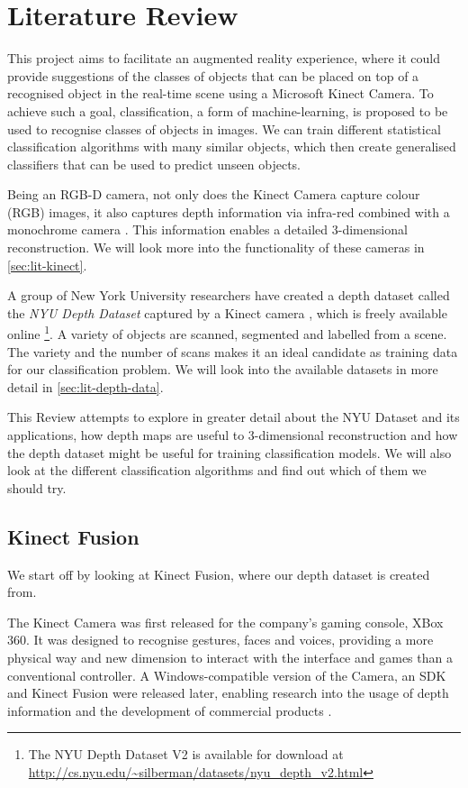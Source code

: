 \chapter{Literature Review} \label{chap:lit-review}
This project aims to facilitate an augmented reality experience, where it could provide suggestions of the classes of objects that can be placed on top of a recognised object in the real-time scene using a Microsoft Kinect Camera. To achieve such a goal, classification, a form of machine-learning, is proposed to be used to recognise classes of objects in images. We can train different statistical classification algorithms with many similar objects, which then create generalised classifiers that can be used to predict unseen objects. 

Being an RGB-D camera, not only does the Kinect Camera capture colour (RGB) images, it also captures depth information via infra-red combined with a monochrome camera \cite{kinect-doc}. This information enables a detailed 3-dimensional reconstruction. We will look more into the functionality of these cameras in \autoref{sec:lit-kinect}.

A group of New York University researchers have created a depth dataset called the \textit{NYU Depth Dataset} captured by a Kinect camera \cite{nyu-dataset}, which is freely available online \footnote{The NYU Depth Dataset V2 is available for download at \url{http://cs.nyu.edu/~silberman/datasets/nyu_depth_v2.html}}. A variety of objects are scanned, segmented and labelled from a scene. The variety and the number of scans makes it an ideal candidate as training data for our classification problem. We will look into the available datasets in more detail in \autoref{sec:lit-depth-data}.

This Review attempts to explore in greater detail about the NYU Dataset and its applications, how depth maps are useful to 3-dimensional reconstruction and how the depth dataset might be useful for training classification models. We will also look at the different classification algorithms and find out which of them we should try.

\newpage

\section{Kinect Fusion} \label{sec:lit-kinect}
We start off by looking at Kinect Fusion, where our depth dataset is created from. 

The Kinect Camera was first released for the company's gaming console, XBox 360. It was designed to recognise gestures, faces and voices, providing a more physical way and new dimension to interact with the interface and games than a conventional controller. A Windows-compatible version of the Camera, an SDK and Kinect Fusion were released later, enabling research into the usage of depth information and the development of commercial products \cite{kinect-doc}. 


